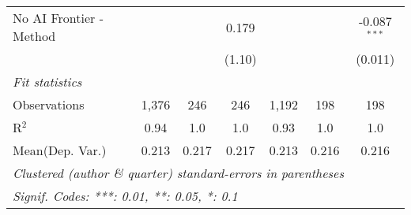 \begin{tabular}{lcccccc}
   No AI Frontier - Method &                &                & 0.179  &                &                & -0.087$^{***}$\\   
                           &                &                & (1.10) &                &                & (0.011)\\   
   \midrule
   \emph{Fit statistics}\\
   Observations            & 1,376          & 246            & 246    & 1,192          & 198            & 198\\  
   R$^2$                   & 0.94           & 1.0            & 1.0    & 0.93           & 1.0            & 1.0\\  
Mean(Dep. Var.) & 0.213 & 0.217 & 0.217 & 0.213 & 0.216 & 0.216 \\
   \midrule \midrule
   \multicolumn{7}{l}{\emph{Clustered (author \& quarter) standard-errors in parentheses}}\\
   \multicolumn{7}{l}{\emph{Signif. Codes: ***: 0.01, **: 0.05, *: 0.1}}\\
\end{tabular}
\par\endgroup
